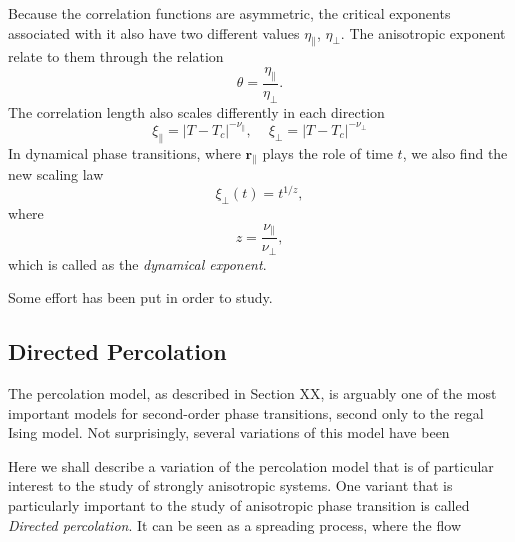 Because the correlation functions are asymmetric, the critical exponents
associated with it also have two different values $\eta_\parallel$,
$\eta_\perp$. The anisotropic exponent relate to them through the relation
\begin{equation}
    \theta = \frac{\eta_\parallel}{\eta_\perp}.
\end{equation}
The correlation length also scales differently in each direction
\begin{equation}
    \xi_{\parallel}=
    \left|T-T_{c}\right|^{-\nu_{\parallel}},
    \,\,\,\,\,\,\,
    \xi_{\perp}=\left|T-T_{c}\right|^{-\nu_{\perp}}
\end{equation}
In dynamical phase transitions, where $\mathbf{r}_\parallel$ plays the role of
time $t$, we also find the new scaling law
\begin{equation}
    \xi_{\perp}\left(t\right)=t^{1/z},
\end{equation}
where
\begin{equation}
    z = \frac{\nu_\parallel}{\nu_\perp},
\end{equation}
which is called as the \textit{dynamical exponent}.

Some effort has been put in order to study.



\subsection{Directed Percolation}
\label{sec:dp}

The percolation model, as described in Section XX, is arguably one of the most
important models for second-order phase transitions, second only to the regal
Ising model. Not surprisingly, several variations of this model have been

Here we shall describe a variation of the percolation model that is of
particular interest to the study of strongly anisotropic systems. One variant
that is particularly important to the study of anisotropic phase transition is
called \textit{Directed percolation}. It can be seen as a spreading process,
where the flow 

